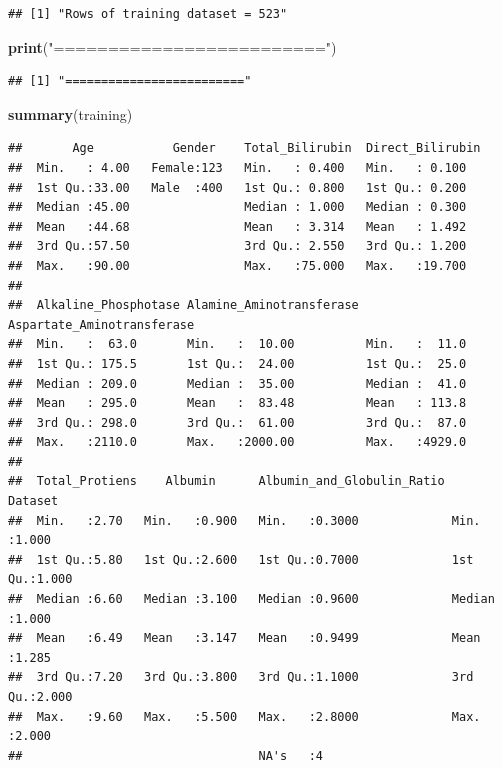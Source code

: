 \documentclass[]{article}
\newenvironment{Shaded}{\begin{snugshade}}{\end{snugshade}}
\newcommand{\KeywordTok}[1]{\textcolor[rgb]{0.13,0.29,0.53}{\textbf{#1}}}
\newcommand{\NormalTok}[1]{#1}
\newcommand{\StringTok}[1]{\textcolor[rgb]{0.31,0.60,0.02}{#1}}
\begin{document}
\begin{Shaded}
\end{Shaded}

\begin{verbatim}
## [1] "Rows of training dataset = 523"
\end{verbatim}

\begin{Shaded}
\begin{Highlighting}[]
\KeywordTok{print}\NormalTok{(}\StringTok{"========================="}\NormalTok{)}
\end{Highlighting}
\end{Shaded}

\begin{verbatim}
## [1] "========================="
\end{verbatim}

\begin{Shaded}
\begin{Highlighting}[]
\KeywordTok{summary}\NormalTok{(training)}
\end{Highlighting}
\end{Shaded}

\begin{verbatim}
##       Age           Gender    Total_Bilirubin  Direct_Bilirubin
##  Min.   : 4.00   Female:123   Min.   : 0.400   Min.   : 0.100  
##  1st Qu.:33.00   Male  :400   1st Qu.: 0.800   1st Qu.: 0.200  
##  Median :45.00                Median : 1.000   Median : 0.300  
##  Mean   :44.68                Mean   : 3.314   Mean   : 1.492  
##  3rd Qu.:57.50                3rd Qu.: 2.550   3rd Qu.: 1.200  
##  Max.   :90.00                Max.   :75.000   Max.   :19.700  
##                                                                
##  Alkaline_Phosphotase Alamine_Aminotransferase Aspartate_Aminotransferase
##  Min.   :  63.0       Min.   :  10.00          Min.   :  11.0            
##  1st Qu.: 175.5       1st Qu.:  24.00          1st Qu.:  25.0            
##  Median : 209.0       Median :  35.00          Median :  41.0            
##  Mean   : 295.0       Mean   :  83.48          Mean   : 113.8            
##  3rd Qu.: 298.0       3rd Qu.:  61.00          3rd Qu.:  87.0            
##  Max.   :2110.0       Max.   :2000.00          Max.   :4929.0            
##                                                                          
##  Total_Protiens    Albumin      Albumin_and_Globulin_Ratio    Dataset     
##  Min.   :2.70   Min.   :0.900   Min.   :0.3000             Min.   :1.000  
##  1st Qu.:5.80   1st Qu.:2.600   1st Qu.:0.7000             1st Qu.:1.000  
##  Median :6.60   Median :3.100   Median :0.9600             Median :1.000  
##  Mean   :6.49   Mean   :3.147   Mean   :0.9499             Mean   :1.285  
##  3rd Qu.:7.20   3rd Qu.:3.800   3rd Qu.:1.1000             3rd Qu.:2.000  
##  Max.   :9.60   Max.   :5.500   Max.   :2.8000             Max.   :2.000  
##                                 NA's   :4
\end{verbatim}
\end{document}
